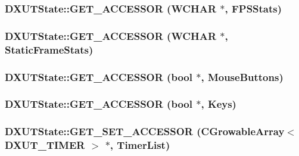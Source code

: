 \label{class_d_x_u_t_state_aebdf3b3dfa93bd3cd58a3411e8f0b2f0}
\hypertarget{class_d_x_u_t_state_ab396180bd85d5be854658da163a2c8ff}{
\subsubsection[{GET\_\-ACCESSOR}]{\setlength{\rightskip}{0pt plus 5cm}DXUTState::GET\_\-ACCESSOR (WCHAR $\ast$, \/  FPSStats)}}
\label{class_d_x_u_t_state_ab396180bd85d5be854658da163a2c8ff}
\hypertarget{class_d_x_u_t_state_a10ba07c1ae189caa70da612eefa31398}{
\subsubsection[{GET\_\-ACCESSOR}]{\setlength{\rightskip}{0pt plus 5cm}DXUTState::GET\_\-ACCESSOR (WCHAR $\ast$, \/  StaticFrameStats)}}
\label{class_d_x_u_t_state_a10ba07c1ae189caa70da612eefa31398}
\hypertarget{class_d_x_u_t_state_a5e175783f28008da6fb627e41e7fb42b}{
\subsubsection[{GET\_\-ACCESSOR}]{\setlength{\rightskip}{0pt plus 5cm}DXUTState::GET\_\-ACCESSOR (bool $\ast$, \/  MouseButtons)}}
\label{class_d_x_u_t_state_a5e175783f28008da6fb627e41e7fb42b}
\hypertarget{class_d_x_u_t_state_ac428f4c61a8d23b084a0b1c19cd0598e}{
\subsubsection[{GET\_\-ACCESSOR}]{\setlength{\rightskip}{0pt plus 5cm}DXUTState::GET\_\-ACCESSOR (bool $\ast$, \/  Keys)}}
\label{class_d_x_u_t_state_ac428f4c61a8d23b084a0b1c19cd0598e}
\hypertarget{class_d_x_u_t_state_a33e87175ee78c0a5dff55f181237d7a2}{
\subsubsection[{GET\_\-SET\_\-ACCESSOR}]{\setlength{\rightskip}{0pt plus 5cm}DXUTState::GET\_\-SET\_\-ACCESSOR ({\bf CGrowableArray}$<$ {\bf DXUT\_\-TIMER} $>$ $\ast$, \/  TimerList)}}
